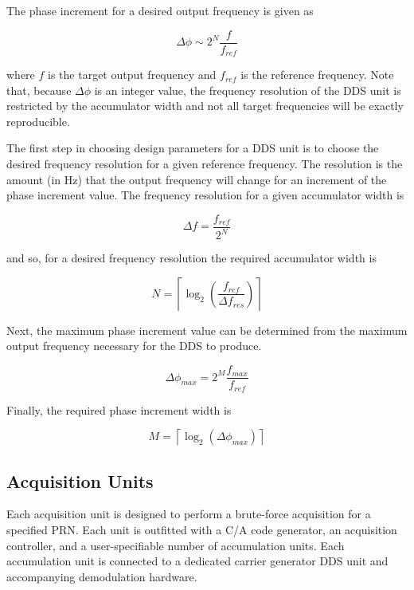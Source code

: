 \documentclass[12pt]{article}
\begin{document}
The phase increment for a desired output frequency is given as

\begin{equation*}
\Delta\phi \sim 2^N\frac{f}{f_{ref}}
\end{equation*}

where $f$ is the target output frequency and $f_{ref}$ is the reference frequency. Note that, because $\Delta\phi$ is an integer value, the frequency resolution of the DDS unit is restricted by the accumulator width and not all target frequencies will be exactly reproducible.

The first step in choosing design parameters for a DDS unit is to choose the desired frequency resolution for a given reference frequency. The resolution is the amount (in Hz) that the output frequency will change for an increment of the phase increment value. The frequency resolution for a given accumulator width is

\begin{equation*}
\Delta f = \frac{f_{ref}}{2^N}
\end{equation*}

and so, for a desired frequency resolution the required accumulator width is

\begin{equation*}
N = \left\lceil \log_2\left( \frac{f_{ref}}{\Delta f_{res}} \right) \right\rceil
\end{equation*}

Next, the maximum phase increment value can be determined from the maximum output frequency necessary for the DDS to produce.

\begin{equation*}
\Delta\phi_{max}=2^M\frac{f_{max}}{f_{ref}}
\end{equation*}

Finally, the required phase increment width is

\begin{equation*}
M = \left\lceil \log_2\left( \Delta\phi_{max} \right) \right\rceil
\end{equation*}

\subsection{Acquisition Units}
Each acquisition unit is designed to perform a brute-force acquisition for a specified PRN. Each unit is outfitted with a C/A code generator, an acquisition controller, and a user-specifiable number of accumulation units. Each accumulation unit is connected to a dedicated carrier generator DDS unit and accompanying demodulation hardware.
\end{document}
